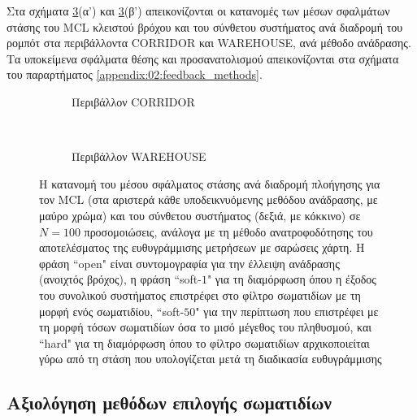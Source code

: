 Στα σχήματα \ref{fig:02_02_04:feedbacks}(α') και
\ref{fig:02_02_04:feedbacks}(β') απεικονίζονται οι κατανομές των μέσων
σφαλμάτων στάσης του MCL κλειστού βρόχου και του σύνθετου συστήματος ανά
διαδρομή του ρομπότ στα περιβάλλοντα CORRIDOR και WAREHOUSE, ανά μέθοδο
ανάδρασης. Τα υποκείμενα σφάλματα θέσης και προσανατολισμού απεικονίζονται στα
σχήματα του παραρτήματος \ref{appendix:02:feedback_methods}.

\begin{figure}
  \vspace{2cm}
  \begin{subfigure}{\linewidth}
  \hspace{-1.25cm}
    
    \vspace{0.3cm}
    \caption{Περιβάλλον CORRIDOR}
    \label{}
  \end{subfigure}\\
  \begin{subfigure}{\linewidth}\vspace{0.5cm}
    \hspace{-1.25cm}
    
    \vspace{0.3cm}
    \caption{Περιβάλλον WAREHOUSE}
    \label{}
    \end{subfigure}
\caption{\small Η κατανομή του μέσου σφάλματος στάσης ανά διαδρομή πλοήγησης
         για τον MCL (στα αριστερά κάθε υποδεικνυόμενης μεθόδου ανάδρασης, με
         μαύρο χρώμα) και του σύνθετου συστήματος (δεξιά, με κόκκινο) σε
         $N=100$ προσομοιώσεις, ανάλογα με τη μέθοδο ανατροφοδότησης του
         αποτελέσματος της ευθυγράμμισης μετρήσεων με σαρώσεις χάρτη. Η φράση
         ``open" είναι συντομογραφία για την έλλειψη ανάδρασης (ανοιχτός
         βρόχος), η φράση ``soft-$1$" για τη διαμόρφωση όπου η έξοδος του
         συνολικού συστήματος επιστρέφει στο φίλτρο σωματιδίων με τη μορφή ενός
         σωματιδίου, ``soft-$50$" για την περίπτωση που επιστρέφει με τη μορφή
         τόσων σωματιδίων όσα το μισό μέγεθος του πληθυσμού, και ``hard" για τη
         διαμόρφωση όπου το φίλτρο σωματιδίων αρχικοποιείται γύρω από τη στάση
         που υπολογίζεται μετά τη διαδικασία ευθυγράμμισης}
\label{fig:02_02_04:feedbacks}
\end{figure}


\subsection{Αξιολόγηση μεθόδων επιλογής σωματιδίων}

